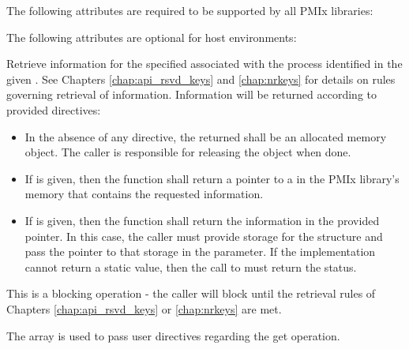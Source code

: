 \reqattrstart
The following attributes are required to be supported by all \ac{PMIx} libraries:


\reqattrend

\optattrstart
The following attributes are optional for host environments:


\optattrend

\descr

Retrieve information for the specified  associated with the process identified in the given . See Chapters \ref{chap:api_rsvd_keys} and \ref{chap:nrkeys} for details on rules governing retrieval of information. Information will be returned according to provided directives:

\begin{itemize}
    \item In the absence of any directive, the returned  shall be an allocated memory object. The caller is responsible for releasing the object when done.
    \item If  is given, then the function shall return a pointer to a  in the \ac{PMIx} library's memory that contains the requested information.
    \item If  is given, then the function shall return the information in the provided  pointer. In this case, the caller must provide storage for the structure and pass the pointer to that storage in the  parameter. If the implementation cannot return a static value, then the call to  must return the  status.
\end{itemize}

This is a blocking operation - the caller will block until the retrieval rules of Chapters \ref{chap:api_rsvd_keys} or \ref{chap:nrkeys} are met.

The  array is used to pass user directives regarding the get operation.

